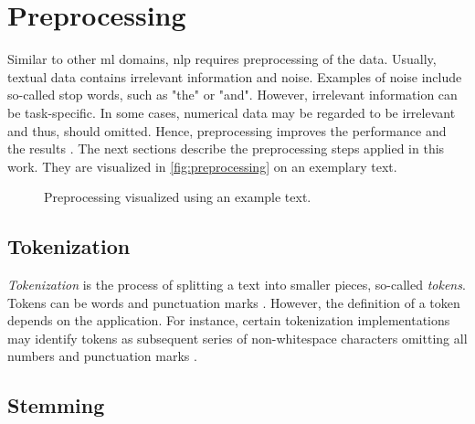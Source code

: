 \section{Preprocessing}\label{sec:preprocessing}

Similar to other \ac{ml} domains, \ac{nlp} requires preprocessing of the data.
Usually, textual data contains irrelevant information and noise.
Examples of noise include so-called stop words, such as "the" or "and".
However, irrelevant information can be task-specific. 
In some cases, numerical data may be regarded to be irrelevant and thus, should omitted.
Hence, preprocessing improves the performance and the results \cite{clusteringDocs2020}.
The next sections describe the preprocessing steps applied in this work.
They are visualized in \autoref{fig:preprocessing} on an exemplary text.

\begin{figure}[htp] %
    \centering
    
    \caption[Preprocessing]{Preprocessing visualized using an example text.}
    \label{fig:preprocessing}
\end{figure}


\subsection{Tokenization}\label{subsec:tokenization}

\textit{Tokenization} is the process of splitting a text into smaller pieces, so-called \textit{tokens}.
Tokens can be words and punctuation marks \cite{nlp-book2009}.
However, the definition of a token depends on the application.
For instance, certain tokenization implementations may identify tokens as subsequent series of non-whitespace characters omitting all numbers and punctuation marks \cite{IR2011}.


\subsection{Stemming}\label{subsec:stemming}


